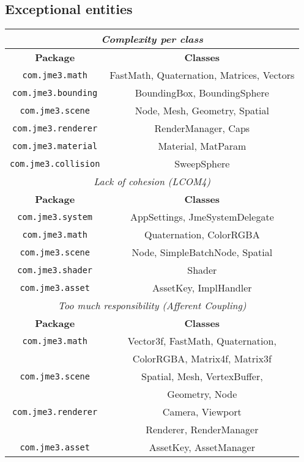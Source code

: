 \documentclass[a4paper, 10pt]{article}
\begin{document}

\subsection{Exceptional entities}
\label{sec:exceptional_entities}

\begin{tabular}{|c|c|}
\hline
\multicolumn{2}{|c|}{\textit{Complexity per class}}\\
\hline
\textbf{Package} & \textbf{Classes}\\
\hline
\verb|com.jme3.math|			& FastMath, Quaternation, Matrices, Vectors\\
\hline
\verb|com.jme3.bounding|		& BoundingBox, BoundingSphere\\
\hline
\verb|com.jme3.scene|			& Node, Mesh, Geometry, Spatial\\
\hline
\verb|com.jme3.renderer|		& RenderManager, Caps\\
\hline
\verb|com.jme3.material|		& Material, MatParam\\
\hline
\verb|com.jme3.collision|		& SweepSphere\\
\hline

\hline
\multicolumn{2}{|c|}{\textit{Lack of cohesion (LCOM4)}}\\
\hline
\textbf{Package} & \textbf{Classes}\\
\hline
\verb|com.jme3.system|		& AppSettings, JmeSystemDelegate\\
\hline
\verb|com.jme3.math|		& Quaternation, ColorRGBA\\
\hline
\verb|com.jme3.scene|		& Node, SimpleBatchNode, Spatial\\
\hline
\verb|com.jme3.shader|		& Shader\\
\hline
\verb|com.jme3.asset|		& AssetKey, ImplHandler\\
\hline

\hline
\multicolumn{2}{|c|}{\textit{Too much responsibility (Afferent Coupling)}}\\
\hline
\textbf{Package} & \textbf{Classes}\\
\hline
\verb|com.jme3.math|		& Vector3f, FastMath, Quaternation,\\
                                & ColorRGBA, Matrix4f, Matrix3f\\
\hline
\verb|com.jme3.scene|		& Spatial, Mesh, VertexBuffer,\\
				& Geometry, Node\\
\hline
\verb|com.jme3.renderer|	& Camera, Viewport\\
				& Renderer, RenderManager\\
\hline
\verb|com.jme3.asset|		& AssetKey, AssetManager\\
\hline


\end{tabular}
\end{document}
